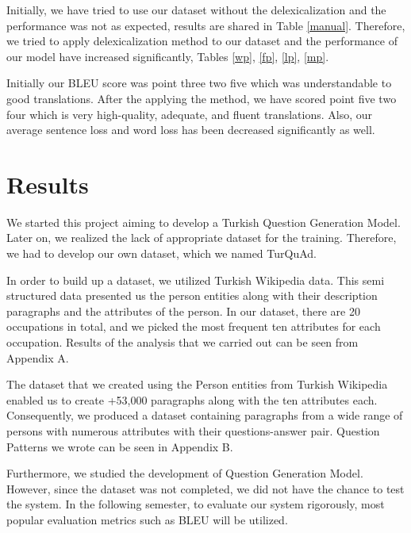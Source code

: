 \documentclass{mefsdp}
\begin{document}
Initially, we have tried to use our dataset without the delexicalization and the performance was not as expected, results are shared in Table \ref{manual}. Therefore, we tried to apply delexicalization method to our dataset and the performance of our model have increased significantly, Tables \ref{wp}, \ref{fp}, \ref{lp}, \ref{mp}.\newline \par 

Initially our BLEU score was point three two five which was understandable to good translations. After the applying the method, we have scored point five two four which is very high-quality, adequate, and fluent translations. Also, our average sentence loss and word loss has been decreased significantly as well.

	\pagebreak
	\section{Results}
	We started this project aiming to develop a Turkish Question Generation Model. Later on, we realized the lack of appropriate dataset for the training. Therefore, we had to develop our own dataset, which we named TurQuAd.  \newline \par
	
	In order to build up a dataset, we utilized Turkish Wikipedia data. This semi structured data presented us the person entities along with their description paragraphs and the attributes of the person. In our dataset, there are 20 occupations in total, and we picked the most frequent ten attributes for each occupation. Results of the analysis that we carried out can be seen from Appendix A.\newline \par
	
	The dataset that we created using the Person entities from Turkish Wikipedia enabled us to create +53,000 paragraphs along with the ten attributes each. Consequently, we produced a dataset containing paragraphs from a wide range of persons with numerous attributes with their questions-answer pair. Question Patterns we wrote can be seen in Appendix B. \newline \par
	
	Furthermore, we studied the development of Question Generation Model. However, since the dataset was not completed, we did not have the chance to test the system. In the following semester, to evaluate our system rigorously, most popular evaluation metrics such as BLEU will be utilized.
	\newline \par
	
\end{document}
